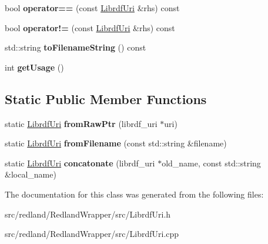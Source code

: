 \begin{DoxyCompactItemize}
\mbox{\label{classredland_1_1LibrdfUri_a02d802c21de7c9dba4133779701e3a45}} 
bool {\bfseries operator==} (const \hyperlink{classredland_1_1LibrdfUri}{Librdf\+Uri} \&rhs) const
\item 
\mbox{\label{classredland_1_1LibrdfUri_a8ded118526be9cfdbe6dbc87d075fb06}} 
bool {\bfseries operator!=} (const \hyperlink{classredland_1_1LibrdfUri}{Librdf\+Uri} \&rhs) const
\item 
\mbox{\label{classredland_1_1LibrdfUri_ad24448f9b22adce080a35decc4694479}} 
std\+::string {\bfseries to\+Filename\+String} () const
\item 
\mbox{\label{classredland_1_1LibrdfUri_a77105fe3bed8bced2001bfee738f7032}} 
int {\bfseries get\+Usage} ()
\end{DoxyCompactItemize}
\subsection*{Static Public Member Functions}
\begin{DoxyCompactItemize}
\item 
\mbox{\label{classredland_1_1LibrdfUri_a518761e1fbfd8c2f79dcac01b05c720b}} 
static \hyperlink{classredland_1_1LibrdfUri}{Librdf\+Uri} {\bfseries from\+Raw\+Ptr} (librdf\+\_\+uri $\ast$uri)
\item 
\mbox{\label{classredland_1_1LibrdfUri_ad7245bf32a2538d220ec7d3a0afc0802}} 
static \hyperlink{classredland_1_1LibrdfUri}{Librdf\+Uri} {\bfseries from\+Filename} (const std\+::string \&filename)
\item 
\mbox{\label{classredland_1_1LibrdfUri_a58ab2ce202cc9b563d1dc60a20a545b2}} 
static \hyperlink{classredland_1_1LibrdfUri}{Librdf\+Uri} {\bfseries concatonate} (librdf\+\_\+uri $\ast$old\+\_\+name, const std\+::string \&local\+\_\+name)
\end{DoxyCompactItemize}


The documentation for this class was generated from the following files\+:\begin{DoxyCompactItemize}
\item 
src/redland/\+Redland\+Wrapper/src/Librdf\+Uri.\+h\item 
src/redland/\+Redland\+Wrapper/src/Librdf\+Uri.\+cpp\end{DoxyCompactItemize}
